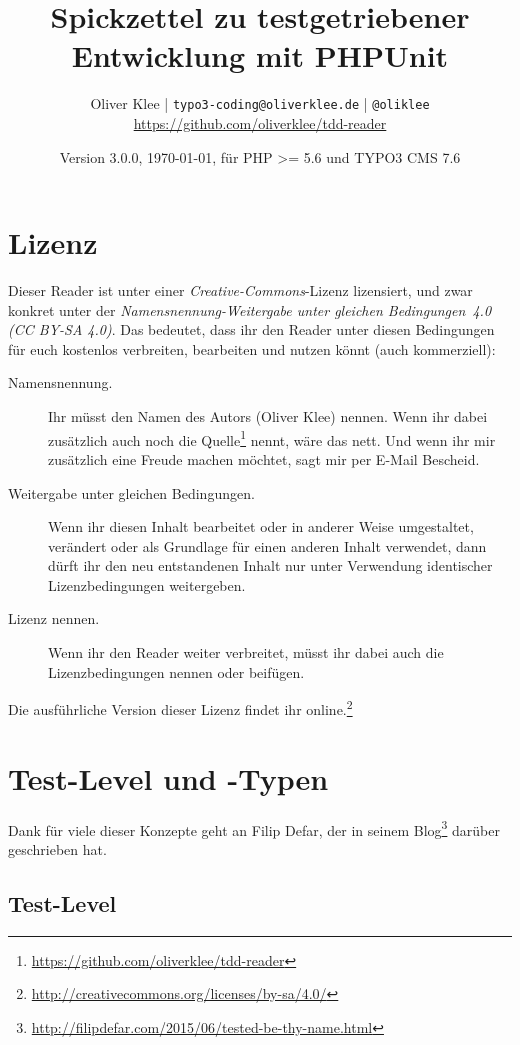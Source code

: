 \documentclass[a4paper,11pt,headsepline]{scrartcl}
\author{
  Oliver Klee | \texttt{typo3-coding@oliverklee.de} | \texttt{@oliklee} \\
  \url{https://github.com/oliverklee/tdd-reader}
}
\date{Version 3.0.0, \today, für PHP >= 5.6 und TYPO3 CMS 7.6}
\title{
  Spickzettel zu testgetriebener Entwicklung mit PHPUnit
}
\begin{document}
\maketitle

\section*{Lizenz}

Dieser Reader ist unter einer \emph{Creative-Commons}-Lizenz lizensiert, und zwar konkret unter der \emph{Namensnennung-Weitergabe unter gleichen Bedingungen~4.0 (CC BY-SA 4.0)}. Das bedeutet, dass ihr den Reader unter diesen Bedingungen für euch kostenlos verbreiten, bearbeiten und nutzen könnt (auch kommerziell):

\begin{description}
  \item[Namensnennung.] Ihr müsst den Namen des Autors (Oliver Klee) nennen. Wenn ihr dabei zusätzlich auch noch die Quelle\footnote{\url{https://github.com/oliverklee/tdd-reader}} nennt, wäre das nett. Und wenn ihr mir zusätzlich eine Freude machen möchtet, sagt mir per E-Mail Bescheid.
  \item[Weitergabe unter gleichen Bedingungen.] Wenn ihr diesen Inhalt bearbeitet oder in anderer Weise umgestaltet, verändert oder als Grundlage für einen anderen Inhalt verwendet, dann dürft ihr den neu entstandenen Inhalt nur unter Verwendung identischer Lizenzbedingungen weitergeben.
  \item[Lizenz nennen.] Wenn ihr den Reader weiter verbreitet, müsst ihr dabei auch die Lizenzbedingungen nennen oder beifügen.
\end{description}

Die ausführliche Version dieser Lizenz findet ihr online.\footnote{\url{http://creativecommons.org/licenses/by-sa/4.0/}}


\pagebreak
\tableofcontents

\pagebreak
\section{Test-Level und -Typen}

Dank für viele dieser Konzepte geht an Filip Defar, der in seinem Blog\footnote{\url{http://filipdefar.com/2015/06/tested-be-thy-name.html}} darüber geschrieben hat.


\subsection{Test-Level}
\end{document}
